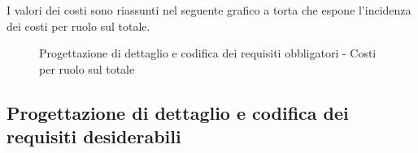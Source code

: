 			\noindent
			I valori dei costi sono riassunti nel seguente grafico a torta che espone l’incidenza dei costi per ruolo sul totale.
			\begin{center}
				\begin{figure}[htbp]
				\vspace{0.8cm}
				\caption{Progettazione di dettaglio e codifica dei requisiti obbligatori - Costi per ruolo sul totale}
				\end{figure}
			\end{center}
		
	\newpage
	\subsection{Progettazione di dettaglio e codifica dei requisiti desiderabili} %
	\label{sub:progettazione_di_dettaglio_e_codifica_dei_requisiti_desiderabili}
